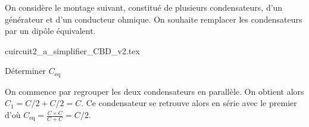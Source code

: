 \hauteurLargeurCadreReponse		{8mm}{4cm}
\typeEntrainement				{} %
\initialisationEntrainement

On considère le montage suivant, constitué de plusieurs condensateurs, d'un générateur et d'un conducteur ohmique. 
On souhaite remplacer les condensateurs par un dipôle équivalent.
\begin{center}
{cuircuit2_a_simplifier_CBD_v2.tex}
\end{center}

\debutEntrainement


\begin{enonce}
Déterminer $C_\text{eq}$
\end{enonce}


\begin{corrige}
On commence par regrouper les deux condensateurs en parallèle. On obtient alors $C_1 = C/2 + C/2 = C$. Ce condensateur se retrouve alors en série avec le premier d'où $C_\text{eq} = \frac{C \times C}{C+C} = C/2$.
\end{corrige}


\finEntrainement





\medskip

